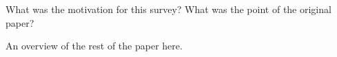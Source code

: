 What was the motivation for this survey? What was the point of the original
paper?

An overview of the rest of the paper here.


